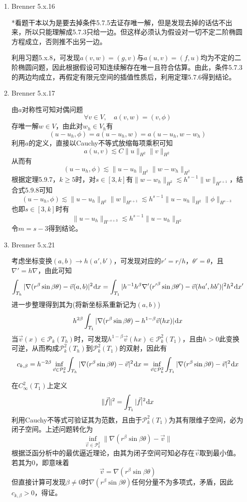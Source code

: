 \documentclass[a4paper,UTF8,fontset=windows,10pt]{ctexart}
\newcommand*{\dr}{\hspace{0.07em}\mathrm{d}}
\begin{document}
\begin{enumerate}
    \item Brenner 5.x.16
    
    *看题干本以为是要去掉条件5.7.5去证存唯一解，但是发现去掉的话估不出来，所以只能理解成5.7.3只给一边。但这样必须认为假设对一切不定二阶椭圆方程成立，否则推不出另一边。
    
    利用习题5.x.8，可发现$a(v,w)=(g,v)$与$a(u,v)=(f,u)$均为不定的二阶椭圆问题，因此根据假设可知连续解存在唯一且符合估算。由此，条件5.7.3的两边均成立，再假定有限元空间的插值性质后，利用定理5.7.6得到结论。
    
    \item Brenner 5.x.17
    
    由$a$对称性可知对偶问题
    $$\forall v\in V,\quad a(v,w)=(v,\phi)$$
    存唯一解$w\in V$，由此对$w_h\in V_h$有
    $$(u-u_h,\phi)=a(u-u_h,w)=a(u-u_h,w-w_h)$$
    利用$a$的定义，直接以Cauchy不等式放缩每项乘积可知
    $$a(u,v)\lesssim C\|u\|_{H^2}\|v\|_{H^2}$$
    从而有
    $$(u-u_h,\phi)\lesssim\|u-u_h\|_{H^2}\|w-w_h\|_{H^2}$$
    根据定理5.9.7，$k\ge5$时，对$s\in[3,k]$有$\|w-w_h\|_{H^2}\lesssim h^{s-1}\|w\|_{H^{s+1}}$，结合式5.9.8可知
    $$(u-u_h,\phi)\lesssim\|u-u_h\|_{H^2}\|w\|_{H^{s+1}}\lesssim h^{s-1}\|u-u_h\|_{H^2}\|\phi\|_{H^{s-3}}$$
    也即$s\in[3,k]$时有
    $$\|u-u_h\|_{H^{-s+3}}\lesssim h^{s-1}\|u-u_h\|_{H^2}$$
    令$m=s-3$得到结论。
    
    \item Brenner 5.x.21
    
    考虑坐标变换$(a,b)\to h(a',b')$，可发现对应的$r'=r/h$，$\theta'=\theta$，且$\nabla'=h\nabla$，由此可知
    $$\int_{T_h}|\nabla(r^\beta\sin\beta\theta)-\vec{v}(a,b)|^2\dr x=\int_{T_1}|h^{-1}h^\beta\nabla'({r'}^\beta\sin\beta\theta')-\vec{v}(ha',hb')|^2h^2\dr x'$$
    进一步整理得到其为(将新坐标系重新记为$(a,b)$)
    $$h^{2\beta}\int_{T_1}|\nabla(r^\beta\sin\beta\theta)-h^{1-\beta}\vec{v}(hx)|\dr x$$
    当$\vec{v}(x)\in\mathcal{P}_k(T_h)$时，可发现$h^{1-\beta}\vec{v}(hx)\in\mathcal{P}_k^2(T_1)$，且由$h>0$此变换可逆，从而构成$\mathcal{P}_k^2(T_h)$到$\mathcal{P}_k^2(T_1)$的双射，因此有
    $$c_{k,\beta}=h^{-2\beta}\inf_{\vec{v}\in\mathcal{P}_k^2}\int_{T_h}|\nabla(r^\beta\sin\beta\theta)-\vec{v}|^2\dr x=\inf_{\vec{v}\in\mathcal{P}_k^2}\int_{T_1}|\nabla(r^\beta\sin\beta\theta)-\vec{v}|^2\dr x$$
    
    在$C_\infty^2(T_1)$上定义
    $$\|\vec{f}\|^2=\int_{T_1}|\vec{f}|^2\dr x$$
    利用Cauchy不等式可验证其为范数，且由于$\mathcal{P}_k^2(T_1)$为其有限维子空间，必为闭子空间。上述问题转化为
    $$\inf_{\vec{v}\in\mathcal{P}_k^2}\|\nabla(r^\beta\sin\beta\theta)-\vec{v}\|$$
    根据泛函分析中的最优逼近理论，由其为闭子空间可知必存在$\vec{v}$取到最小值。若其为0，即意味着
    $$\vec{v}=\nabla(r^\beta\sin\beta\theta)$$
    但直接计算可发现$\beta\ne0$时$\nabla(r^\beta\sin\beta\theta)$任何分量不为多项式，矛盾，因此$c_{k,\beta}>0$，得证。
    

\end{enumerate}
\end{document}
